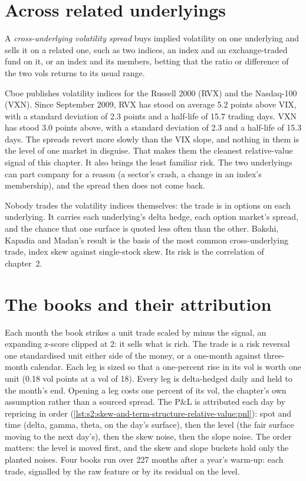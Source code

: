 \section{Across related underlyings}

\begin{definition}\label{def:s2:skew-and-term-structure-relative-value:cross}
A \emph{cross-underlying volatility spread} buys implied volatility on one underlying and sells it on a
related one, such as two indices, an index and an exchange-traded fund on it, or an index and its members, betting that the ratio or difference of the
two vols returns to its usual range.
\end{definition}

Cboe publishes volatility indices for the Russell 2000 (RVX) and the Nasdaq-100 (VXN). Since September 2009, RVX has stood on average 5.2 points above
VIX, with a standard deviation of 2.3 points and a half-life of 15.7 trading days. VXN has stood 3.0 points above, with a standard deviation of 2.3 and
a half-life of 15.3 days. The spreads revert more slowly than the VIX slope, and nothing in them is the level of one market in disguise. That makes them
the cleanest relative-value signal of this chapter. It also brings the least familiar risk. The two underlyings can part company for a reason (a
sector's crash, a change in an index's membership), and the spread then does not come back.

Nobody trades the volatility indices themselves: the trade is in options on each underlying. It carries each underlying's delta hedge, each option
market's spread, and the chance that one surface is quoted less often than the other. Bakshi, Kapadia and Madan's result is the basis of the most
common cross-underlying trade, index skew against single-stock skew. Its risk is the correlation of chapter~2.

\section{The books and their attribution}

Each month the book strikes a unit trade scaled by minus the signal, an expanding z-score clipped at 2: it sells what is rich. The trade is a risk
reversal one standardised unit either side of the money, or a one-month against three-month calendar. Each leg is sized so that a one-percent rise in
its vol is worth one unit (0.18 vol points at a vol of 18). Every leg is delta-hedged daily and held to the month's end. Opening a leg costs one
percent of its vol, the chapter's own assumption rather than a sourced spread. The P\&L is attributed each day by repricing in order
(\cref{lst:s2:skew-and-term-structure-relative-value:pnl}): spot and time (delta, gamma, theta, on the day's surface), then the level (the fair surface
moving to the next day's), then the skew noise, then the slope noise. The order matters: the level is moved first, and the skew and slope buckets hold
only the planted noises. Four books run over 227 months after a year's warm-up: each trade, signalled by the raw feature or by its residual on the
level.

